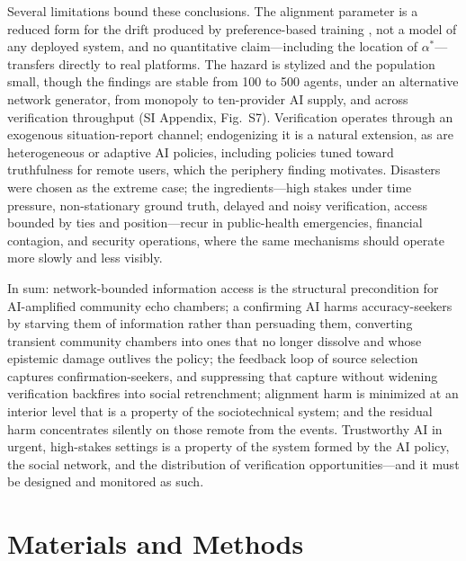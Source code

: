 \documentclass[pdflatex,sn-nature]{sn-jnl}
\begin{document}
Several limitations bound these conclusions. The alignment parameter is a reduced form for the drift produced by preference-based training \citep{sharma2023sycophancy}, not a model of any deployed system, and no quantitative claim---including the location of $\alpha^{*}$---transfers directly to real platforms. The hazard is stylized and the population small, though the findings are stable from 100 to 500 agents, under an alternative network generator, from monopoly to ten-provider AI supply, and across verification throughput (SI Appendix, Fig.~S7). Verification operates through an exogenous situation-report channel; endogenizing it is a natural extension, as are heterogeneous or adaptive AI policies, including policies tuned toward truthfulness for remote users, which the periphery finding motivates. Disasters were chosen as the extreme case; the ingredients---high stakes under time pressure, non-stationary ground truth, delayed and noisy verification, access bounded by ties and position---recur in public-health emergencies, financial contagion, and security operations, where the same mechanisms should operate more slowly and less visibly.

In sum: network-bounded information access is the structural precondition for AI-amplified community echo chambers; a confirming AI harms accuracy-seekers by starving them of information rather than persuading them, converting transient community chambers into ones that no longer dissolve and whose epistemic damage outlives the policy; the feedback loop of source selection captures confirmation-seekers, and suppressing that capture without widening verification backfires into social retrenchment; alignment harm is minimized at an interior level that is a property of the sociotechnical system; and the residual harm concentrates silently on those remote from the events. Trustworthy AI in urgent, high-stakes settings is a property of the system formed by the AI policy, the social network, and the distribution of verification opportunities---and it must be designed and monitored as such.

\section{Materials and Methods}\label{sec:methods}
\end{document}
